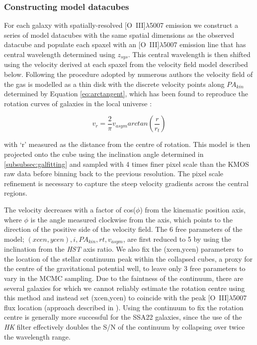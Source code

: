 \documentclass[fleqn,usenatbib]{mn2e}
\begin{document}
\subsubsection{Constructing model datacubes}\label{subsubec:model_cube}
For each galaxy with spatially-resolved [O~{\sc III}]$\lambda$5007 emission we construct a series of model datacubes with the same spatial dimensions as the observed datacube and populate each spaxel with an [O~{\sc III}]$\lambda$5007 emission line that has central wavelength determined using $z_{sys}$.
This central wavelength is then shifted using the velocity derived at each spaxel from the velocity field model described below.  
Following the procedure adopted by numerous authors \citep[e.g.][]{Epinat2010,Epinat2012,Swinbank2012,Stott2016,Mason2016} the velocity field of the gas is modelled as a thin disk with the discrete velocity points along $PA_{kin}$ determined by Equation \ref{eq:arctangent}, which has been found to reproduce the rotation curves of galaxies in the local universe \citep[e.g.][]{Courteau1997}:

\begin{equation}\label{eq:arctangent}
   v_{r} = \frac{2}{\pi}v_{asym}arctan\left(\frac{r}{r_{t}}\right)
\end{equation}

\noindent
with `r' measured as the distance from the centre of rotation.
This model is then projected onto the cube using the inclination angle determined in \cref{subsubsec:galfitting} and sampled with 4 times finer pixel scale than the KMOS raw data before binning back to the previous resolution.
The pixel scale refinement is necessary to capture the steep velocity gradients across the central regions.

The velocity decreases with a factor of cos($\phi$) from the kinematic position axis, where $\phi$ is the angle measured clockwise from the axis, which points to the direction of the positive side of the velocity field.
The 6 free parameters of the model; $(xcen, ycen), i, PA_{kin}, rt, v_{asym}$, are first reduced to 5 by using the inclination from the {\em HST} axis ratio.
We also fix the (xcen,ycen) parameters to the location of the stellar continuum peak within the collapsed cubes, a proxy for the centre of the gravitational potential well, to leave only 3 free parameters to vary in the MCMC sampling.
Due to the faintness of the continuum, there are several galaxies for which we cannot reliably estimate the rotation centre using this method and instead set (xcen,ycen) to coincide with the peak [O~{\sc III}]$\lambda$5007 flux location (approach described in \citealt{Harrison2017}).
Using the continuum to fix the rotation centre is generally more successful for the SSA22 galaxies, since the use of the {\it HK} filter effectively doubles the S/N of the continuum by collapsing over twice the wavelength range. \\
\end{document}
